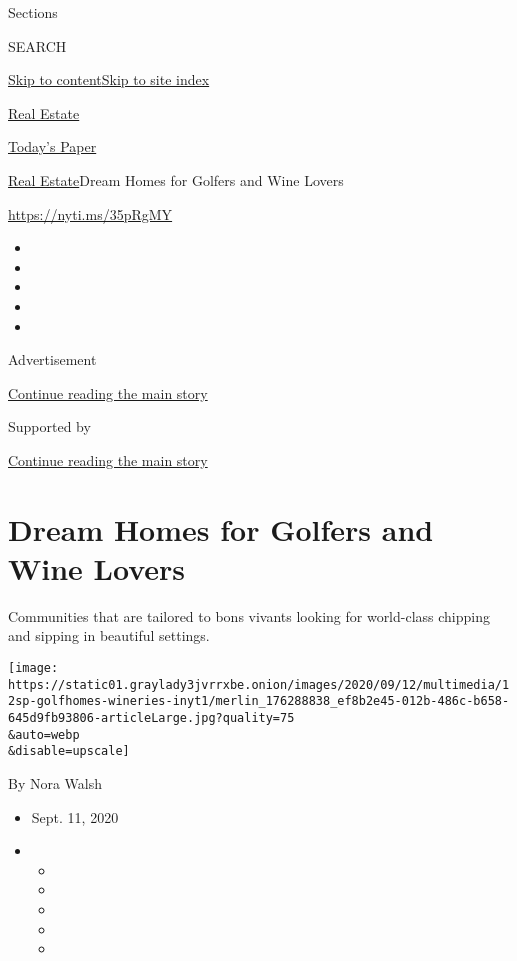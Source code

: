 Sections

SEARCH

\protect\hyperlink{site-content}{Skip to
content}\protect\hyperlink{site-index}{Skip to site index}

\href{https://www.nytimes3xbfgragh.onion/section/realestate}{Real
Estate}

\href{https://myaccount.nytimes3xbfgragh.onion/auth/login?response_type=cookie\&client_id=vi}{}

\href{https://www.nytimes3xbfgragh.onion/section/todayspaper}{Today's
Paper}

\href{/section/realestate}{Real Estate}\textbar{}Dream Homes for Golfers
and Wine Lovers

\url{https://nyti.ms/35pRgMY}

\begin{itemize}
\item
\item
\item
\item
\item
\end{itemize}

Advertisement

\protect\hyperlink{after-top}{Continue reading the main story}

Supported by

\protect\hyperlink{after-sponsor}{Continue reading the main story}

\hypertarget{dream-homes-for-golfers-and-wine-lovers}{%
\section{Dream Homes for Golfers and Wine
Lovers}\label{dream-homes-for-golfers-and-wine-lovers}}

Communities that are tailored to bons vivants looking for world-class
chipping and sipping in beautiful settings.

\texttt{[image: https://static01.graylady3jvrrxbe.onion/images/2020/09/12/multimedia/12sp-golfhomes-wineries-inyt1/merlin\_176288838\_ef8b2e45-012b-486c-b658-645d9fb93806-articleLarge.jpg?quality=75\\\&auto=webp\\\&disable=upscale]}

By Nora Walsh

\begin{itemize}
\item
  Sept. 11, 2020
\item
  \begin{itemize}
  \item
  \item
  \item
  \item
  \item
  \end{itemize}
\end{itemize}

